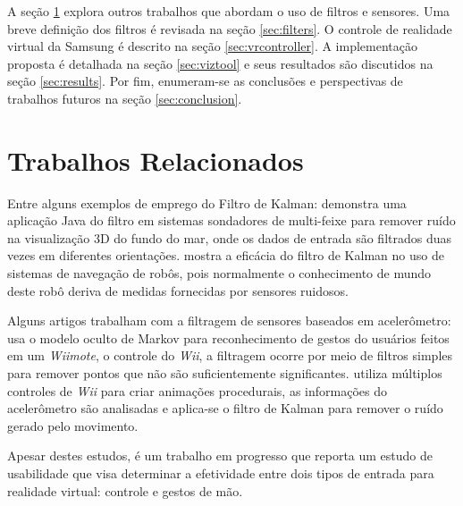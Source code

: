 \documentclass[conference]{IEEEtran}
\begin{document}
A seção \ref{sec:relatedworks} explora outros trabalhos que abordam o uso de filtros e sensores. Uma breve definição dos filtros é revisada na seção \ref{sec:filters}. O controle de realidade virtual da Samsung é descrito na seção \ref{sec:vrcontroller}. A implementação proposta é detalhada na seção \ref{sec:viztool} e seus resultados são discutidos na seção \ref{sec:results}. Por fim, enumeram-se as conclusões e perspectivas de trabalhos futuros na seção \ref{sec:conclusion}.

\section{Trabalhos Relacionados} \label{sec:relatedworks}

Entre alguns exemplos de emprego do Filtro de Kalman: \cite{demkowiczkalman} demonstra uma aplicação Java do filtro em sistemas sondadores de multi-feixe para remover ruído na visualização 3D do fundo do mar, onde os dados de entrada são filtrados duas vezes em diferentes orientações. \cite{choset2005principles} mostra a eficácia do filtro de Kalman no uso de sistemas de navegação de robôs, pois normalmente o conhecimento de mundo deste robô deriva de medidas fornecidas por sensores ruidosos.

Alguns artigos trabalham com a filtragem de sensores baseados em acelerômetro: \cite{schlomer2008gesture} usa o modelo oculto de Markov para reconhecimento de gestos do usuários feitos em um \textit{Wiimote}, o controle do \textit{Wii}, a filtragem ocorre por meio de filtros simples para remover pontos que não são suficientemente significantes. \cite{shiratori2008accelerometer} utiliza múltiplos controles de \textit{Wii} para criar animações procedurais, as informações do acelerômetro são analisadas e aplica-se o filtro de Kalman para remover o ruído  gerado pelo movimento.

Apesar destes estudos, \cite{VRDataGlove} é um trabalho em progresso que reporta um estudo de usabilidade que visa determinar a efetividade entre dois tipos de entrada para realidade virtual: controle e gestos de mão. 

\end{document}
